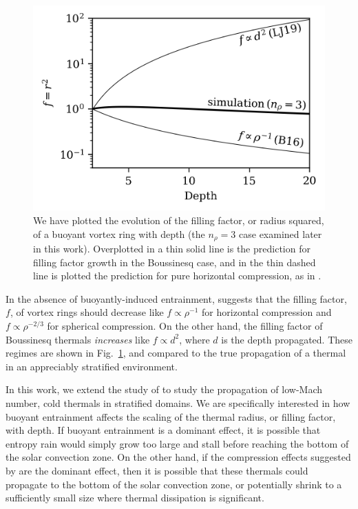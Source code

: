 \documentclass[twocolumn, amsmath, amsfonts, amssymb, trackchanges]{aastex62}
\begin{document}
\begin{figure}[t!]
    \includegraphics[width=\columnwidth]{overview_fig.png}
    \caption{
	We have plotted the evolution of the filling factor, or radius squared, of a buoyant vortex ring with depth (the $n_\rho = 3$ case examined later in this work). 
	Overplotted in a thin solid line is the prediction for filling factor growth in the Boussinesq case, and in the thin dashed line is plotted the prediction for pure horizontal compression, as in \citet{brandenburg2016}.
    \label{fig:overview} }
\end{figure}

In the absence of buoyantly-induced entrainment, \citet{brandenburg2016} suggests that the filling factor, $f$, of vortex rings should decrease like $f \propto \rho^{-1}$ for horizontal compression and $f \propto \rho^{-2/3}$ for spherical compression. 
On the other hand, the filling factor of Boussinesq thermals \emph{increases} like $f \propto d^2$, where $d$ is the depth propagated.
These regimes are shown in Fig.~\ref{fig:overview}, and compared to the true propagation of a thermal in an appreciably stratified environment.

In this work, we extend the study of \citet{lecoanet&jeevanjee2018} to study the propagation of low-Mach number, cold thermals in stratified domains. 
We are specifically interested in how buoyant entrainment affects the scaling of the thermal radius, or filling factor, with depth. 
If buoyant entrainment is a dominant effect, it is possible that entropy rain would simply grow too large and stall before reaching the bottom of the solar convection zone.
On the other hand, if the compression effects suggested by \citet{brandenburg2016} are the dominant effect, then it is possible that these thermals could propagate to the bottom of the solar
convection zone, or potentially shrink to a sufficiently small size where thermal dissipation is significant.
\end{document}
